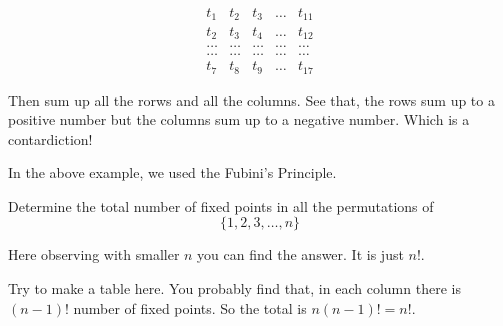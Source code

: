 \begin{center}
\[
\begin{matrix}
t_1 & t_2 & t_3 & \ldots & t_{11}\\
t_2 & t_3 & t_4 & \ldots & t_{12}\\
\ldots & \ldots & \ldots & \ldots & \ldots \\
\ldots & \ldots & \ldots & \ldots & \ldots \\
t_7 & t_8 & t_9 & \ldots & t_{17}
\end{matrix} 
\]
\end{center}
Then sum up all the rorws and all the columns. See that, the rows sum up to a positive number but the columns sum up to a negative number.
Which is a contardiction!
\begin{remark*}
In the above example, we used the Fubini's Principle.
\end{remark*}
\begin{example}
Determine the total number of fixed points in all the permutations of \[ \{1, 2, 3, \ldots , n\}\]
\end{example}
Here observing with smaller $n$ you can find the answer. It is just $n!$.

Try to make a table here. You probably find that, in each column there is $(n-1)!$ number of fixed points.
So the total is $n(n-1)!=n!$.





